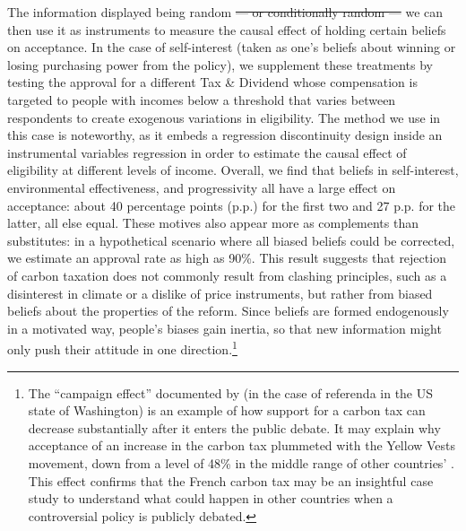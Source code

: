 \documentclass[12pt]{article} %
\providecommand{\DIFdeltex}[1]{{\protect\color{red}\sout{#1}}}                      %
\providecommand{\DIFaddend}{} %
\providecommand{\DIFdelbegin}{} %
\providecommand{\DIFdelend}{} %
\providecommand{\DIFdel}[1]{\texorpdfstring{\DIFdeltex{#1}}{}} %
\newcommand{\DIFscaledelfig}{0.5}
\newlength{\DIFdelgraphicswidth} %
\newlength{\DIFdelgraphicsheight} %
\newcommand{\DIFdelincludegraphics}[2][]{%
\sbox{\DIFdelgraphicsbox}{\DIFOincludegraphics[#1]{#2}}%
\settoboxwidth{\DIFdelgraphicswidth}{\DIFdelgraphicsbox} %
\settoboxtotalheight{\DIFdelgraphicsheight}{\DIFdelgraphicsbox} %
\scalebox{\DIFscaledelfig}{%
\parbox[b]{\DIFdelgraphicswidth}{\usebox{\DIFdelgraphicsbox}\\[-\baselineskip] \rule{\DIFdelgraphicswidth}{0em}}\llap{\resizebox{\DIFdelgraphicswidth}{\DIFdelgraphicsheight}{%
\setlength{\unitlength}{\DIFdelgraphicswidth}%
\begin{picture}(1,1)%
\thicklines\linethickness{2pt} %
{\color[rgb]{1,0,0}\put(0,0){\framebox(1,1){}}}%
{\color[rgb]{1,0,0}\put(0,0){\line( 1,1){1}}}%
{\color[rgb]{1,0,0}\put(0,1){\line(1,-1){1}}}%
\end{picture}%
}\hspace*{3pt}}} %
} %
\DeclareRobustCommand{\DIFaddend}{\DIFOaddend \let\includegraphics\DIFOincludegraphics} %
\DeclareRobustCommand{\DIFdelbegin}{\DIFOdelbegin \let\includegraphics\DIFdelincludegraphics} %
\DeclareRobustCommand{\DIFdelend}{\DIFOaddend \let\includegraphics\DIFOincludegraphics} %
\begin{document}
\DIFaddend The information displayed being random \DIFdelbegin \DIFdel{--- or conditionally random --- }\DIFdelend we can then use it as instruments to measure the causal effect of holding certain beliefs on acceptance. In the case of self-interest (taken as one's beliefs about winning or losing purchasing power from the policy), we supplement these treatments by testing the approval for a different Tax \& Dividend whose compensation is targeted to people with incomes below a threshold that varies between respondents to create exogenous variations in eligibility. The method we use in this case is noteworthy, as it embeds a regression discontinuity design inside an instrumental variables regression in order to estimate the causal effect of eligibility at different levels of income. Overall, we find that beliefs in self-interest, environmental effectiveness, and progressivity all have a large effect on acceptance: about 40 percentage points (p.p.) for the first two and 27 p.p. for the latter, all else equal. These motives also appear more as complements than substitutes: in a hypothetical scenario where all biased beliefs could be corrected, we estimate an approval rate as high as 90\%. This result suggests that rejection of carbon taxation does not commonly result from clashing principles, such as a disinterest in climate or a dislike of price instruments, but rather from biased beliefs about the properties of the reform. Since beliefs are formed endogenously in a motivated way, people's biases gain inertia, so that new information might only push their attitude in one direction.\footnote{The ``campaign effect'' documented by \citet{anderson_can_2019} (in the case of referenda in the US state of Washington) is an example of how support for a carbon tax can decrease substantially after it enters the public debate. It may explain why acceptance of an increase in the carbon tax plummeted with the Yellow Vests movement, down from a level of 48\% \citep{ademe_representations_2018} in the middle range of other countries' \citep{brechin_public_2010}. This effect confirms that the French carbon tax may be an insightful case study to understand what could happen in other countries when a controversial policy is publicly debated.} %
\end{document}
